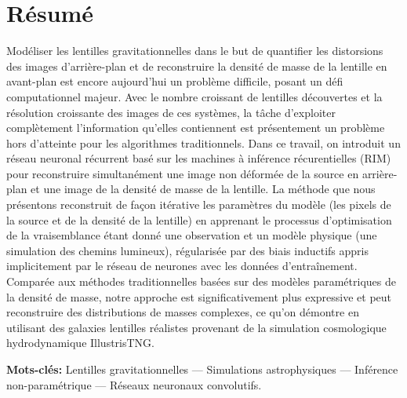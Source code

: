 \section*{Résumé}
Modéliser les lentilles gravitationnelles dans le but de quantifier les distorsions des images 
d'arrière-plan et de reconstruire la densité de masse de la lentille en avant-plan est encore aujourd'hui 
un problème difficile, posant un défi computationnel majeur. Avec le nombre croissant de lentilles découvertes et 
la résolution croissante des images de ces systèmes, la tâche d'exploiter complètement l'information qu'elles contiennent 
est présentement un problème hors d'atteinte pour les algorithmes traditionnels.
Dans ce travail, on introduit un réseau neuronal récurrent basé sur les machines à inférence récurentielles (RIM) 
pour reconstruire simultanément une image non déformée de la source en arrière-plan et une image de la densité de masse de la lentille. 
La méthode que nous présentons reconstruit de façon itérative les paramètres du modèle (les pixels de la source et de la densité de la lentille) 
en apprenant le processus d'optimisation de la vraisemblance étant donné une observation et un modèle physique (une simulation des chemins lumineux), 
régularisée par des biais inductifs appris implicitement par le réseau de neurones avec les données d'entraînement. 
Comparée aux méthodes traditionnelles basées sur des modèles paramétriques de la densité de masse, notre approche 
est significativement plus expressive et peut reconstruire des distributions de masses complexes, ce qu'on démontre 
en utilisant des galaxies lentilles réalistes provenant de la simulation cosmologique hydrodynamique IllustrisTNG.

\textbf{Mots-clés:} Lentilles gravitationnelles ---
        Simulations astrophysiques  ---
        Inférence non-paramétrique ---
        Réseaux neuronaux convolutifs.


